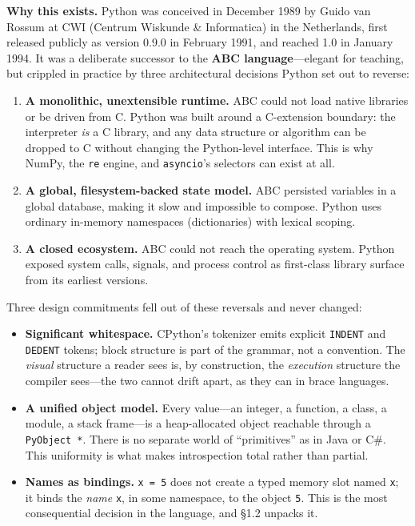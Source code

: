 \textbf{Why this exists.} Python was conceived in December 1989 by Guido van Rossum at CWI
(Centrum Wiskunde \& Informatica) in the Netherlands, first released publicly as version
0.9.0 in February 1991, and reached 1.0 in January 1994. It was a deliberate successor to
the \textbf{ABC language}---elegant for teaching, but crippled in practice by three
architectural decisions Python set out to reverse:

\begin{enumerate}
  \item \textbf{A monolithic, unextensible runtime.} ABC could not load native libraries or
    be driven from C. Python was built around a C-extension boundary: the interpreter
    \emph{is} a C library, and any data structure or algorithm can be dropped to C without
    changing the Python-level interface. This is why NumPy, the \texttt{re} engine, and
    \texttt{asyncio}'s selectors can exist at all.
  \item \textbf{A global, filesystem-backed state model.} ABC persisted variables in a
    global database, making it slow and impossible to compose. Python uses ordinary
    in-memory namespaces (dictionaries) with lexical scoping.
  \item \textbf{A closed ecosystem.} ABC could not reach the operating system. Python
    exposed system calls, signals, and process control as first-class library surface from
    its earliest versions.
\end{enumerate}

Three design commitments fell out of these reversals and never changed:

\begin{itemize}
  \item \textbf{Significant whitespace.} CPython's tokenizer emits explicit \texttt{INDENT}
    and \texttt{DEDENT} tokens; block structure is part of the grammar, not a convention.
    The \emph{visual} structure a reader sees is, by construction, the \emph{execution}
    structure the compiler sees---the two cannot drift apart, as they can in brace
    languages.
  \item \textbf{A unified object model.} Every value---an integer, a function, a class, a
    module, a stack frame---is a heap-allocated object reachable through a
    \texttt{PyObject *}. There is no separate world of ``primitives'' as in Java or C\#.
    This uniformity is what makes introspection total rather than partial.
  \item \textbf{Names as bindings.} \texttt{x = 5} does not create a typed memory slot named
    \texttt{x}; it binds the \emph{name} \texttt{x}, in some namespace, to the object
    \texttt{5}. This is the most consequential decision in the language, and §1.2 unpacks it.
\end{itemize}


